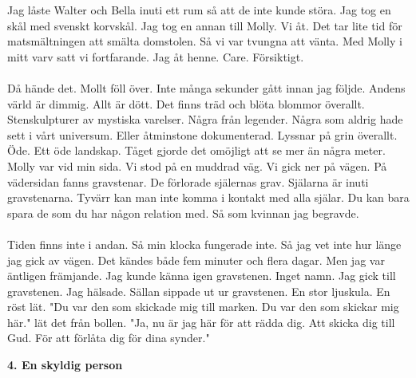 \documentclass[]{article}
\begin{document}
Jag låste Walter och Bella inuti ett rum så att de inte kunde störa. Jag tog en skål med svenskt korvskål. Jag tog en annan till Molly. Vi åt. Det tar lite tid för matsmältningen att smälta domstolen. Så vi var tvungna att vänta. Med Molly i mitt varv satt vi fortfarande. Jag åt henne. Care. Försiktigt.
\\ \\
Då hände det. Mollt föll över. Inte många sekunder gått innan jag följde. Andens värld är dimmig. Allt är dött. Det finns träd och blöta blommor överallt. Stenskulpturer av mystiska varelser. Några från legender. Några som aldrig hade sett i vårt universum. Eller åtminstone dokumenterad. Lyssnar på grin överallt. Öde. Ett öde landskap. Tåget gjorde det omöjligt att se mer än några meter. Molly var vid min sida. Vi stod på en muddrad väg. Vi gick ner på vägen. På vädersidan fanns gravstenar. De förlorade själernas grav. Själarna är inuti gravstenarna. Tyvärr kan man inte komma i kontakt med alla själar. Du kan bara spara de som du har någon relation med. Så som kvinnan jag begravde.
\\ \\
Tiden finns inte i andan. Så min klocka fungerade inte. Så jag vet inte hur länge jag gick av vägen. Det kändes både fem minuter och flera dagar. Men jag var äntligen främjande. Jag kunde känna igen gravstenen. Inget namn. Jag gick till gravstenen. Jag hälsade. Sällan sippade ut ur gravstenen. En stor ljuskula. En röst lät. "Du var den som skickade mig till marken. Du var den som skickar mig här." lät det från bollen. "Ja, nu är jag här för att rädda dig. Att skicka dig till Gud. För att förlåta dig för dina synder."

\begin{center}
	\large\textbf{4. En skyldig person}
\end{center}
\end{document}
